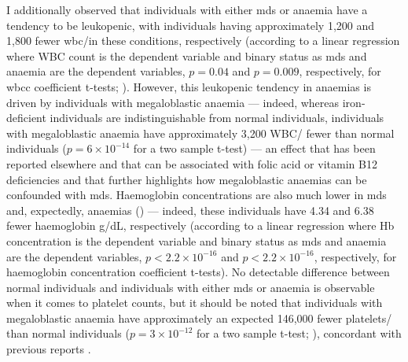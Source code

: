 \begin{figure}[!ht]
    \label{fig:mds-age}
\end{figure}

\begin{figure}[!ht]
    \label{fig:mds-sex}
\end{figure}

I additionally observed that individuals with either \ac{mds} or anaemia have a tendency to be leukopenic, with individuals having approximately 1,200 and 1,800 fewer \ac{wbc}/\Mum in these conditions, respectively (according to a linear regression where WBC count is the dependent variable and binary status as \ac{mds} and anaemia are the dependent variables, $p=0.04$ and $p=0.009$, respectively, for \ac{wbcc} coefficient t-tests; ). However, this leukopenic tendency in anaemias is driven by individuals with megaloblastic anaemia --- indeed, whereas iron-deficient individuals are indistinguishable from normal individuals, individuals with megaloblastic anaemia have approximately 3,200 WBC/\Mum{} fewer than normal individuals ($p=6 \times 10^{-14}$ for a two sample t-test) --- an effect that has been reported elsewhere and that can be associated with folic acid or vitamin B12 deficiencies \cite{Kaferle2009-pl,Castle1978-ky} and that further highlights how megaloblastic anaemias can be confounded with \ac{mds}. Haemoglobin concentrations are also much lower in \ac{mds} and, expectedly, anaemias () --- indeed, these individuals have 4.34 and 6.38 fewer haemoglobin g/dL, respectively (according to a linear regression where Hb concentration is the dependent variable and binary status as \ac{mds} and anaemia are the dependent variables, $p<2.2 \times 10^{-16}$ and $p<2.2 \times 10^{-16}$, respectively, for haemoglobin concentration coefficient t-tests). No detectable difference between normal individuals and individuals with either \ac{mds} or anaemia is observable when it comes to platelet counts, but it should be noted that individuals with megaloblastic anaemia have approximately an expected 146,000 fewer platelets/\Mum{} than normal individuals ($p=3 \times 10^{-12}$ for a two sample t-test; ), concordant with previous reports \cite{Castle1978-ky}. 

\begin{figure}[!ht]
    \label{fig:mds-wbcc}
\end{figure}

